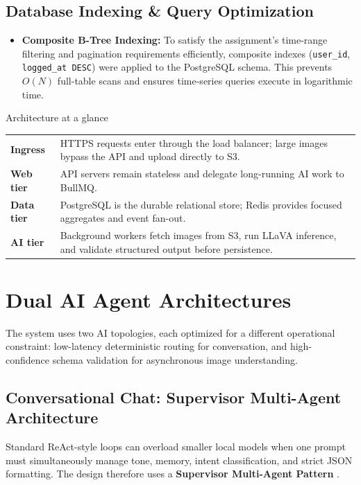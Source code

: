 \documentclass[11pt,a4paper,twoside]{article}
\begin{document}
\subsection{Database Indexing \& Query Optimization}
\begin{itemize}
  \item \textbf{Composite B-Tree Indexing:} To satisfy the assignment's time-range filtering and pagination requirements efficiently, composite indexes (\texttt{user\_id}, \texttt{logged\_at DESC}) were applied to the PostgreSQL schema. This prevents $O(N)$ full-table scans and ensures time-series queries execute in logarithmic time.
\end{itemize}

\begin{designbox}{Architecture at a glance}
\begin{tabularx}{\linewidth}{>{\bfseries\sffamily}p{35mm} Y}
Ingress & HTTPS requests enter through the load balancer; large images bypass the API and upload directly to S3. \\[2pt]
Web tier & API servers remain stateless and delegate long-running AI work to BullMQ. \\[2pt]
Data tier & PostgreSQL is the durable relational store; Redis provides focused aggregates and event fan-out. \\[2pt]
AI tier & Background workers fetch images from S3, run LLaVA inference, and validate structured output before persistence.
\end{tabularx}
\end{designbox}

\section{Dual AI Agent Architectures}

The system uses two AI topologies, each optimized for a different operational constraint: low-latency deterministic routing for conversation,
and high-confidence schema validation for asynchronous image understanding.

\subsection{Conversational Chat: Supervisor Multi-Agent Architecture}

Standard ReAct-style loops can overload smaller local models when one prompt must simultaneously manage tone, memory, intent classification,
and strict JSON formatting. The design therefore uses a \textbf{Supervisor Multi-Agent Pattern} \cite{wu2023autogen}.
\end{document}
